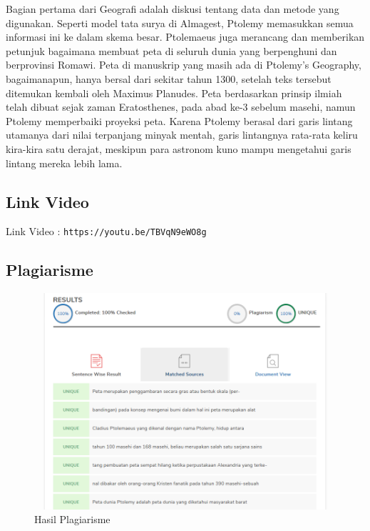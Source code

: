 \begin{itemize}
Bagian pertama dari Geografi adalah diskusi tentang data dan metode yang digunakan. Seperti  model tata surya di Almagest, Ptolemy memasukkan semua informasi ini ke dalam skema besar. Ptolemaeus juga merancang dan memberikan petunjuk bagaimana membuat peta di seluruh dunia yang berpenghuni dan berprovinsi Romawi. Peta di manuskrip yang masih ada di Ptolemy’s Geography, bagaimanapun, hanya bersal dari sekitar tahun 1300, setelah teks tersebut ditemukan kembali oleh Maximus Planudes. Peta berdasarkan prinsip ilmiah telah dibuat sejak zaman Eratosthenes, pada abad ke-3 sebelum masehi, namun Ptolemy memperbaiki proyeksi peta. Karena Ptolemy berasal dari garis lintang utamanya dari nilai terpanjang minyak mentah, garis lintangnya rata-rata keliru kira-kira satu derajat, meskipun para astronom kuno mampu mengetahui garis lintang mereka lebih lama.
\end{itemize}

\subsection{Link Video}
Link Video : \texttt{https://youtu.be/TBVqN9eWO8g}

\subsection{Plagiarisme}
\begin{figure}[!htbp]
\centering
\includegraphics[width=12cm,height=8cm]{figures/tugas1/1174077/plagarisme.PNG}
\caption{Hasil Plagiarisme}
\label{penanda}
\end{figure}